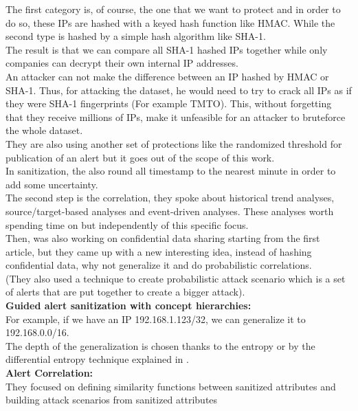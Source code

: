 \documentclass{eplmastersthesis}
\begin{document}
The first category is, of course, the one that we want to protect and in order to do so, these IPs are hashed with a keyed hash function like HMAC. While the second type is hashed by a simple hash algorithm like SHA-1.\\
The result is that we can compare all SHA-1 hashed IPs together while only companies can decrypt their own internal IP addresses.\\
An attacker can not make the difference between an IP hashed by HMAC  or SHA-1. Thus, for attacking the dataset, he would need to try to crack all IPs as if they were SHA-1 fingerprints (For example TMTO). This, without forgetting that they receive millions of IPs, make it unfeasible for an attacker to bruteforce the whole dataset.\\
They are also using another set of protections like the randomized threshold for publication of an alert but it goes out of the scope of this work.\\
In sanitization, the also round all timestamp to the nearest minute in order to add some uncertainty.\\
The second step is the correlation, they spoke about historical trend analyses, source/target-based analyses and event-driven analyses. These analyses worth spending time on but independently of this specific focus.\\

Then, \cite{xu2005privacy} was also working on confidential data sharing starting from the first article, but they came up with a new interesting idea, instead of hashing confidential data, why not generalize it and do probabilistic correlations.\\
(They also used a technique to create probabilistic attack scenario which is a set of alerts that are put together to create a bigger attack).\\
\textbf{Guided alert sanitization with concept hierarchies:}\\
For example, if we have an IP 192.168.1.123/32, we can generalize it to 192.168.0.0/16.\\
The depth of the generalization is chosen thanks to the entropy or by the differential entropy technique explained in \cite{cover1991elements}.
\\
\textbf{Alert Correlation:}\\
They focused on defining similarity functions between sanitized attributes and building attack scenarios from sanitized attributes
\\
\end{document}
